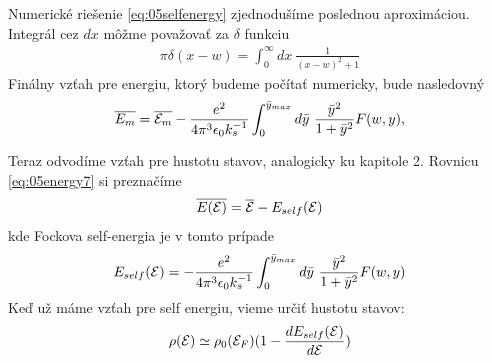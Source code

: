 Numerické riešenie \eqref{eq:05selfenergy} zjednodušíme poslednou aproximáciou. Integrál cez $dx$ môžme považovať za $\delta$ funkciu
\begin{align}
\pi\delta(x-w)=\int_0^{\infty}dx\ \frac{1}{(x-w)^2+1}
\end{align}
Finálny vzťah pre energiu, ktorý budeme počítať numericky, bude nasledovný
\begin{align}
\label{eq:05energy7}
\overline{E_m}=\overline{\mathcal{E}_m}-\frac{e^2}{4\pi^3\epsilon_0 k_s^{-1}} \int_0^{\bar y_{max}} d\bar{y}\ \frac{\bar{y}^2}{1+\bar{y}^2}F(w,y) \text{,}
\end{align} 

Teraz odvodíme vzťah pre hustotu stavov, analogicky ku kapitole 2. Rovnicu \eqref{eq:05energy7} si preznačíme
\begin{align}
\overline{E(\mathcal{E})} = \overline{\mathcal{E}} - E_{self}(\mathcal{E})
\end{align}
kde Fockova self-energia je v tomto prípade 
\begin{align}
\label{eq:05selfenergy}
E_{self}(\mathcal{E})=-\frac{e^2}{4\pi^3\epsilon_0 k_s^{-1}} \int_0^{\bar y_{max}} d\bar{y}\ \frac{\bar{y}^2}{1+\bar{y}^2}F(w,y)
\end{align}
Keď už máme vzťah pre self energiu, vieme určiť hustotu stavov:
\begin{align}
\label{eq:05rho_final}
\rho(\mathcal{E}) \simeq \rho_0(\mathcal{E}_F)(1-\frac{dE_{self}(\mathcal{E})}{d\mathcal{E}})
\end{align}

 

